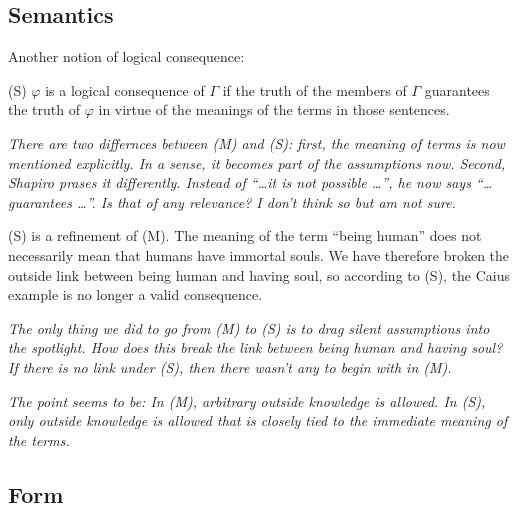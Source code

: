 \documentclass[a4paper]{article}
\begin{document}
\subsection{Semantics}

Another notion of logical consequence:

(S) $\varphi$ is a logical consequence of $\Gamma$ if the truth of the members
of $\Gamma$ guarantees the truth of $\varphi$ in virtue of the meanings of the
terms in those sentences.

\emph{There are two differnces between (M) and (S): first, the meaning of terms
is now mentioned explicitly.  In a sense, it becomes part of the assumptions
now.  Second, Shapiro prases it differently. Instead of ``\ldots it is not
possible \ldots'', he now says ``\ldots guarantees \ldots''.  Is that of any
relevance? I don't think so but am not sure.}

(S) is a refinement of (M).  The meaning of the term ``being human'' does not
necessarily mean that humans have immortal souls.  We have therefore broken the
outside link between being human and having soul, so according to (S), the Caius
example is no longer a valid consequence.

\emph{The only thing we did to go from (M) to (S) is to drag silent assumptions
into the spotlight.  How does this break the link between being human and having
soul? If there is no link under (S), then there wasn't any to begin with in
(M).}

\emph{The point seems to be: In (M), arbitrary outside knowledge is allowed. In
(S), only outside knowledge is allowed that is closely tied to the immediate
meaning of the terms.}

\subsection{Form}




\end{document}
